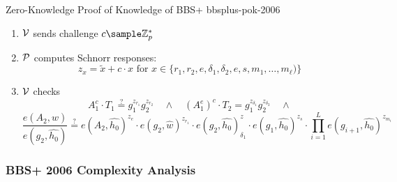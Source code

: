 \begin{protocol}{\cite{hutchison_constant-size_2006} Zero-Knowledge Proof of Knowledge of BBS+ }{bbsplus-pok-2006}
\begin{enumerate}
    \item $\mathcal{V}$ sends challenge $c \sample \Z_p^*$\

    \item $\mathcal{P}$ computes Schnorr responses:
         \[
         z_x = \tilde{x} + c \cdot x \text{ for } x \in \{r_1, r_2, e, \delta_1, \delta_2, e, s, m_1,\ldots,m_{\ell})\}
         \]
 
    \item $\mathcal{V}$ checks
    \[
    A_1^c \cdot T_1 \stackrel{?}{=} g_1^{z_{r_1}}g_2^{z_{r_2}} \quad \wedge \quad (A_1^e)^c \cdot T_2 = g_1^{{z}_{\delta_1}}g_2^{{z}_{\delta_2}} \quad \wedge
    \]
        \[
            \frac{e(A_2, \widehat{w})}{e(g_2, \widehat{h_0})} \stackrel{?}{=}  e(A_2, \hat{h_0})^{z_e} \cdot e(g_2, \hat{w})^{z_{r_1}} \cdot e(g_2, \hat{h_0})^z_{\delta_1} \cdot e(g_1, \hat{h_0})^{z_s} \cdot \prod_{i=1}^L e(g_{i+1}, \hat{h_0})^{z_{m_i}}
        \]
    \end{enumerate}
\end{protocol}

\newpage
\subsubsection{BBS+ 2006 Complexity Analysis}

